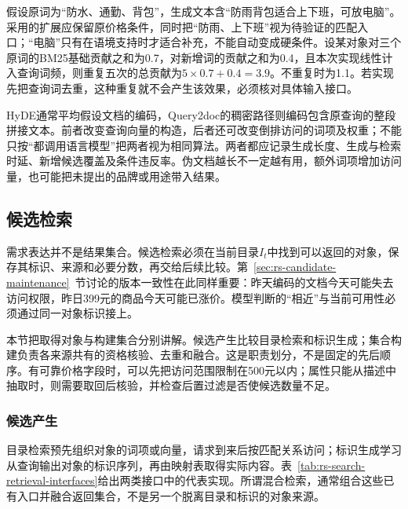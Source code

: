 假设原词为“防水、通勤、背包”，生成文本含“防雨背包适合上下班，可放电脑”。采用的扩展应保留原价格条件，同时把“防雨、上下班”视为待验证的匹配入口；“电脑”只有在语境支持时才适合补充，不能自动变成硬条件。设某对象对三个原词的BM25基础贡献之和为0.7，对新增词的贡献之和为0.4，且本次实现线性计入查询词频，则重复五次的总贡献为$5\times0.7+0.4=3.9$。不重复时为1.1。若实现先把查询词去重，这种重复就不会产生该效果，必须核对具体输入接口。

HyDE通常平均假设文档的编码，Query2doc的稠密路径则编码包含原查询的整段拼接文本。前者改变查询向量的构造，后者还可改变倒排访问的词项及权重；不能只按“都调用语言模型”把两者视为相同算法。两者都应记录生成长度、生成与检索时延、新增候选覆盖及条件违反率。伪文档越长不一定越有用，额外词项增加访问量，也可能把未提出的品牌或用途带入结果。

\subsection{候选检索}
\label{sec:rs-search-retrieval}

需求表达并不是结果集合。候选检索必须在当前目录$I_t$中找到可以返回的对象，保存其标识、来源和必要分数，再交给后续比较。第~\ref{sec:rs-candidate-maintenance}~节讨论的版本一致性在此同样重要：昨天编码的文档今天可能失去访问权限，昨日399元的商品今天可能已涨价。模型判断的“相近”与当前可用性必须通过同一对象标识接上。

本节把取得对象与构建集合分别讲解。候选产生比较目录检索和标识生成；集合构建负责各来源共有的资格核验、去重和融合。这是职责划分，不是固定的先后顺序。有可靠价格字段时，可以先把访问范围限制在500元以内；属性只能从描述中抽取时，则需要取回后核验，并检查后置过滤是否使候选数量不足。

\subsubsection{候选产生}
\label{sec:rs-search-generation}

目录检索预先组织对象的词项或向量，请求到来后按匹配关系访问；标识生成学习从查询输出对象的标识序列，再由映射表取得实际内容。表~\ref{tab:rs-search-retrieval-interfaces}给出两类接口中的代表实现。所谓混合检索，通常组合这些已有入口并融合返回集合，不是另一个脱离目录和标识的对象来源。

